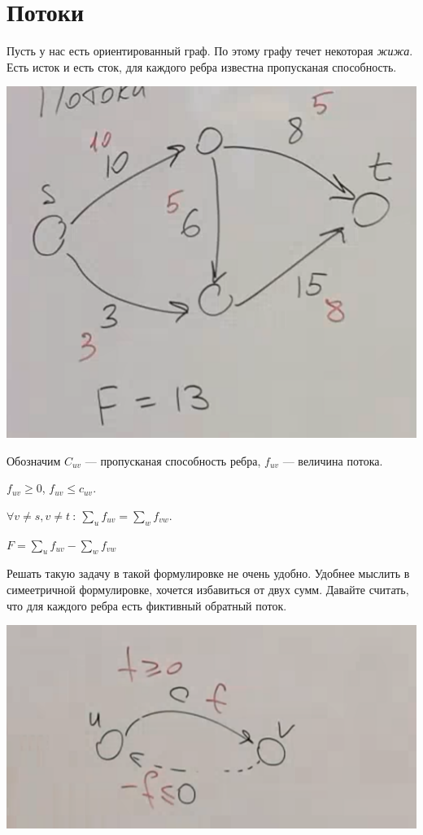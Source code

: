 \section{Потоки}
Пусть у нас есть ориентированный граф. 
По этому графу течет некоторая \textit{жижа}.
Есть исток и есть сток, для каждого ребра известна пропусканая способность.

\begin{center}
    \includegraphics[scale=0.8]{img/flows_ex1.png}
\end{center}

Обозначим $C_{uv}$ --- пропусканая способность ребра, $f_{uv}$ --- величина потока.

$f_{uv} \geqslant 0$, $f_{uv} \leqslant c_{uv}$.

$\forall v \neq s, v \neq t ~:~ \sum\limits_u f_{uv} = \sum\limits_w f_{vw}$.

$F = \sum\limits_u f_{uv} - \sum\limits_w f_{vw}$

Решать такую задачу в такой формулировке не очень удобно. Удобнее мыслить в симеетричной формулировке, хочется избавиться от двух сумм. Давайте считать, что для каждого ребра есть фиктивный обратный поток.

\begin{center}
    \includegraphics[scale=0.8]{img/flows_ex2.png}
\end{center}


